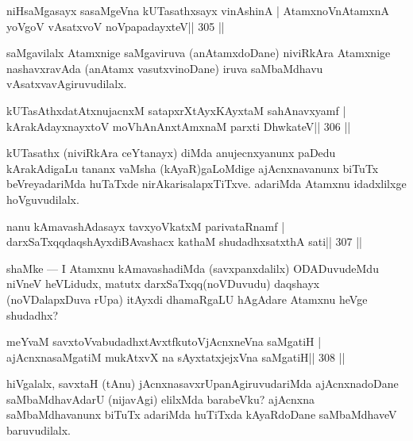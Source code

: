 \begin{shl}
niHsaMgasayx sasaMgeVna kUTasathxsayx vinAshinA |
AtamxnoV\s nAtamxnA yoVgoV vAsatxvoV noVpapadayxteV\hfill || 305 ||
\end{shl}

\begin{artha}
saMgavilalx Atamxnige saMgaviruva (anAtamxdoDane) niviRkAra Atamxnige nashavxravAda (anAtamx vasutxvinoDane) iruva saMbaMdhavu vAsatxvavAgiruvudilalx.
\end{artha}


\begin{shl}
kUTasAthxdatAtxnujacnxM satapxrXtAyxKAyxtaM sahAnavxyamf |
kArakAdayxnayxtoV moVhAnAnx\s\s tAmxnaM parxti DhwkateV\hfill || 306 ||
\end{shl}

\begin{artha}
kUTasathx (niviRkAra ceYtanayx) diMda anujecnxyanunx paDedu 
kArakAdigaLu tananx vaMsha (kAyaR)gaLoMdige ajAcnxnavanunx biTuTx beVreyadariMda huTaTxde nirAkarisalapxTiTxve. adariMda Atamxnu idadxlilxge hoVguvudilalx.
\end{artha}

\begin{shl}
nanu kAmavashAdasayx tavxyoVkatxM parivataRnamf |
darxSaTxqqdaqshAyxdiBAvashacx kathaM shudadhxsatxthA sati\hfill || 307 ||
\end{shl}

\begin{artha}
shaMke  {\rm ---}  I Atamxnu kAmavashadiMda (savxpanxdalilx) ODADuvudeMdu 
niVneV heVLidudx, matutx darxSaTxqq(noVDuvudu) daqshayx (noVDalapxDuva rUpa) itAyxdi dhamaRgaLU hAgAdare Atamxnu heVge shudadhx?
\end{artha}


\begin{shl}
meYvaM savxtoV\s vabudadhxtAvxtfkutoV\s jAcnxneVna saMgatiH |
ajAcnxnasaMgatiM mukAtxvX na sAyxtatxjejxVna saMgatiH\hfill || 308 ||
\end{shl}

\begin{artha}
hiVgalalx, savxtaH (tAnu) jAcnxnasavxrUpanAgiruvudariMda ajAcnxnadoDane saMbaMdha\-vAdarU (nijavAgi) elilxMda barabeVku? ajAcnxna saMbaMdhavanunx biTuTx adariMda huTiTxda kAyaRdoDane saMbaMdhaveV baruvudilalx.
\end{artha}


